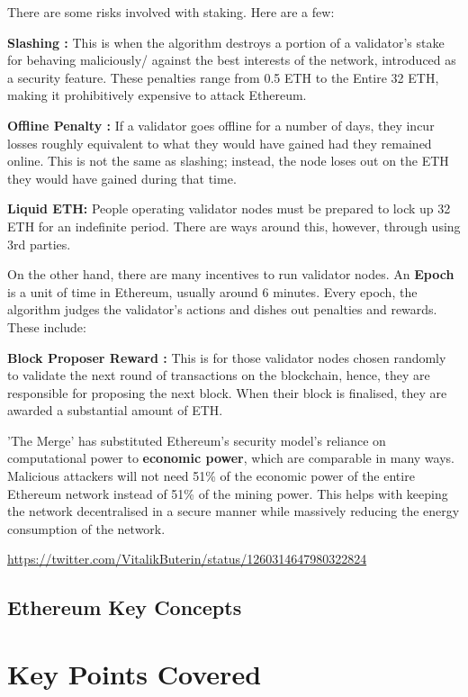 There are some risks involved with staking. Here are a few:

\textbf{Slashing :}
This is when the algorithm destroys a portion of a validator's stake for behaving maliciously/ against the best interests of the network, introduced as a security feature. These penalties range from 0.5 ETH to the Entire 32 ETH, making it prohibitively expensive to attack Ethereum. 

\textbf{Offline Penalty :}
If a validator goes offline for a number of days, they incur losses roughly equivalent to what they would have gained had they remained online. This is not the same as slashing; instead, the node loses out on the ETH they would have gained during that time.

\textbf{Liquid ETH: }
People operating validator nodes must be prepared to lock up 32 ETH for an indefinite period. There are ways around this, however, through using 3rd parties. 
 
On the other hand, there are many incentives to run validator nodes. An \textbf{Epoch} is a unit of time in Ethereum, usually around 6 minutes. Every epoch, the algorithm judges the validator's actions and dishes out penalties and rewards. These include:

\textbf{Block Proposer Reward :}
This is for those validator nodes chosen randomly to validate the next round of transactions on the blockchain, hence, they are responsible for proposing the next block. When their block is finalised, they are awarded a substantial amount of ETH.

'The Merge' has substituted Ethereum's security model's reliance on computational power to \textbf{economic power}, which are comparable in many ways. Malicious attackers will not need 51\% of the economic power of the entire Ethereum network instead of 51\% of the mining power. This helps with keeping the network decentralised in a secure manner while massively reducing the energy consumption of the network. 

\url{https://twitter.com/VitalikButerin/status/1260314647980322824}



\subsection{Ethereum Key Concepts}




\section{Key Points Covered}
